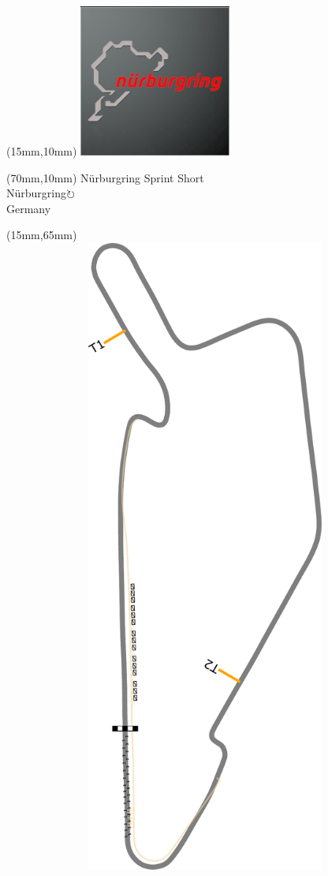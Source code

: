 \null\newpage
\begin{textblock*}{50mm}(15mm,10mm)%
\includegraphics[width=50mm]{LG/2015-05-20_00089.png}
\end{textblock*}
\begin{textblock*}{130mm}(70mm,10mm)%
{\fontsize{20}{20}\selectfont Nürburgring Sprint Short\\}
{\fontsize{16}{16}\selectfont Nürburgring\hfill \Large$\circlearrowright$\\}
{\fontsize{12}{12}\selectfont Germany\\}
\end{textblock*}
\begin{textblock*}{185mm}(15mm,65mm)%
\centering
\mbox{\includegraphics[width=185mm,height=210mm,keepaspectratio]{PT/NBRSPS.pdf}}
\end{textblock*}
